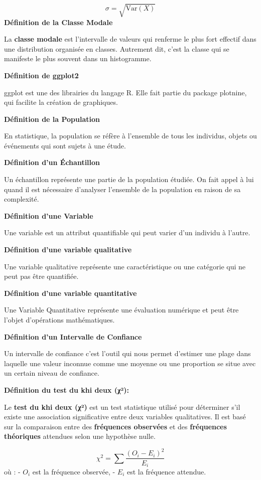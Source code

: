 \documentclass[
]{article}
\begin{document}
\[
\sigma = \sqrt{\text{Var}(X)}
\] \textbf{Définition de la Classe Modale}

La \textbf{classe modale} est l'intervalle de valeurs qui renferme le
plus fort effectif dans une distribution organisée en classes. Autrement
dit, c'est la classe qui se manifeste le plus souvent dans un
histogramme.

\textbf{Définition de ggplot2}

ggplot est une des librairies du langage R. Elle fait partie du package
plotnine, qui facilite la création de graphiques.

\textbf{Définition de la Population}

En statistique, la population se réfère à l'ensemble de tous les
individus, objets ou événements qui sont sujets à une étude.

\textbf{Définition d'un Échantillon}

Un échantillon représente une partie de la population étudiée. On fait
appel à lui quand il est nécessaire d'analyser l'ensemble de la
population en raison de sa complexité.

\textbf{Définition d'une Variable}

Une variable est un attribut quantifiable qui peut varier d'un individu
à l'autre.

\textbf{Définition d'une variable qualitative}

Une variable qualitative représente une caractéristique ou une catégorie
qui ne peut pas être quantifiée.

\textbf{Définition d'une variable quantitative}

Une Variable Quantitative représente une évaluation numérique et peut
être l'objet d'opérations mathématiques.

\textbf{Définition d'un Intervalle de Confiance}

Un intervalle de confiance c'est l'outil qui nous permet d'estimer une
plage dans laquelle une valeur inconnue comme une moyenne ou une
proportion se situe avec un certain niveau de confiance.

\textbf{Définition du test du khi deux (χ²):}

Le \textbf{test du khi deux (χ²)} est un test statistique utilisé pour
déterminer s'il existe une association significative entre deux
variables qualitatives. Il est basé sur la comparaison entre des
\textbf{fréquences observées} et des \textbf{fréquences théoriques}
attendues selon une hypothèse nulle.

\[
\chi^2 = \sum \frac{(O_i - E_i)^2}{E_i}
\] où : - \(O_i\) est la fréquence observée, - \(E_i\) est la fréquence
attendue.
\end{document}
